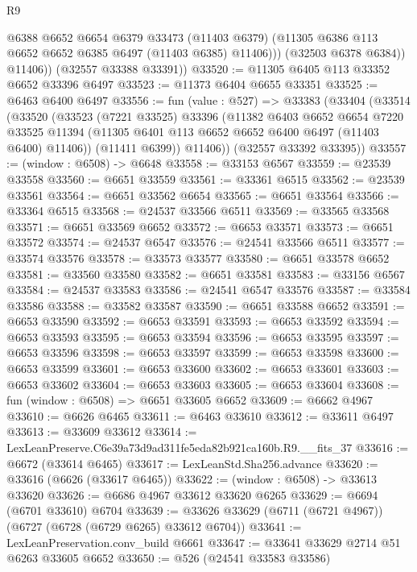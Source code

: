 \begin{lexlean}{R9}
\begin{coremodule}
                @6388
                @6652
                @6654
                @6379
                @33473
                (@11403 @6379)
                (@11305 @6386 @113 @6652 @6652 @6385 @6497 (@11403 @6385) @11406)))
            (@32503 @6378 @6384))
          @11406))
      (@32557 @33388 @33391))
@33520 := @11305 @6405 @113 @33352 @6652 @33396 @6497
@33523 := @11373 @6404 @6655 @33351
@33525 := @6463 @6400 @6497
@33556 := fun (value : @527) =>
  @33383
    (@33404
      (@33514
        (@33520
          (@33523
            (@7221 @33525)
            @33396
            (@11382
              @6403
              @6652
              @6654
              @7220
              @33525
              @11394
              (@11305 @6401 @113 @6652 @6652 @6400 @6497 (@11403 @6400) @11406))
            (@11411 @6399))
          @11406))
      (@32557 @33392 @33395))
@33557 := (window : @6508) -> @6648
@33558 := @33153 @6567
@33559 := @23539 @33558
@33560 := @6651 @33559
@33561 := @33361 @6515
@33562 := @23539 @33561
@33564 := @6651 @33562 @6654
@33565 := @6651 @33564
@33566 := @33364 @6515
@33568 := @24537 @33566 @6511
@33569 := @33565 @33568
@33571 := @6651 @33569 @6652
@33572 := @6653 @33571
@33573 := @6651 @33572
@33574 := @24537 @6547
@33576 := @24541 @33566 @6511
@33577 := @33574 @33576
@33578 := @33573 @33577
@33580 := @6651 @33578 @6652
@33581 := @33560 @33580
@33582 := @6651 @33581
@33583 := @33156 @6567
@33584 := @24537 @33583
@33586 := @24541 @6547 @33576
@33587 := @33584 @33586
@33588 := @33582 @33587
@33590 := @6651 @33588 @6652
@33591 := @6653 @33590
@33592 := @6653 @33591
@33593 := @6653 @33592
@33594 := @6653 @33593
@33595 := @6653 @33594
@33596 := @6653 @33595
@33597 := @6653 @33596
@33598 := @6653 @33597
@33599 := @6653 @33598
@33600 := @6653 @33599
@33601 := @6653 @33600
@33602 := @6653 @33601
@33603 := @6653 @33602
@33604 := @6653 @33603
@33605 := @6653 @33604
@33608 := fun (window : @6508) => @6651 @33605 @6652
@33609 := @6662 @4967
@33610 := @6626 @6465
@33611 := @6463 @33610
@33612 := @33611 @6497
@33613 := @33609 @33612
@33614 := LexLeanPreserve.C6e39a73d9ad311fe5eda82b921ca160b.R9.__fits_37
@33616 := @6672 (@33614 @6465)
@33617 := LexLeanStd.Sha256.advance
@33620 := @33616 (@6626 (@33617 @6465))
@33622 := (window : @6508) -> @33613 @33620
@33626 := @6686 @4967 @33612 @33620 @6265
@33629 := @6694 (@6701 @33610) @6704
@33639 := @33626 @33629 (@6711 (@6721 @4967)) (@6727 (@6728 (@6729 @6265) @33612 @6704))
@33641 := LexLeanPreservation.conv_build @6661
@33647 := @33641 @33629 @2714 @51 @6263 @33605 @6652
@33650 := @526 (@24541 @33583 @33586)

\end{coremodule}
\end{lexlean}

